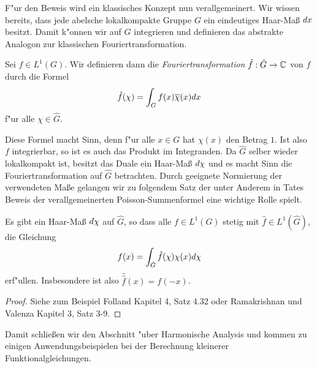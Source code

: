 	F"ur den Beweis wird ein klassisches Konzept nun verallgemeinert.
	Wir wissen bereits, dass jede abelsche lokalkompakte Gruppe $G$ ein eindeutiges Haar-Maß $\dx$ besitzt.
	Damit k"onnen wir auf $G$ integrieren und definieren das abstrakte Analogon zur klassischen Fouriertransformation.
	\begin{defi}[Fouriertransformation]
		Sei $f\in L^1(G)$. Wir definieren dann die \emph{Fouriertransformation} $\hat{f}: \hat{G} \to \C$ von $f$ durch die Formel
		\begin{align*}
			\hat{f}(\chi) = \int_G f(x)\conj{\chi}(x) dx
		\end{align*}
		f"ur alle $\chi \in \hat{G}$.
	\end{defi}
	Diese Formel macht Sinn, denn f"ur alle $x \in G$ hat $\chi(x)$ den Betrag $1$. 
	Ist also $f$ integrierbar, so ist es auch das Produkt im Integranden.
	Da $\hat{G}$ selber wieder lokalkompakt ist, besitzt das Duale ein Haar-Maß $\dx[\chi]$ und es macht Sinn die Fouriertransformation auf $\hat{G}$ betrachten.
	Durch geeignete Normierung der verwendeten Maße gelangen wir zu folgendem Satz der unter Anderem in Tates Beweis der verallgemeinerten Poisson-Summenformel eine wichtige Rolle spielt.
	\begin{satz}
		Es gibt ein Haar-Maß $\dx[\chi]$ auf $\hat{G}$, so dass alle $f \in L^1(G)$ stetig mit $\hat{f} \in L^1(\hat{G})$, die Gleichung
		\begin{align*}
			f(x) = \int_{\hat{G}} \hat{f}(\chi) \chi(x) \dx[\chi]
		\end{align*}
		erf"ullen. Insbesondere ist also $\hat{\hat{f}}(x) = f(-x)$.
	\end{satz}
	\begin{proof}
		Siehe zum Beispiel Folland \cite{folland} Kapitel 4, Satz 4.32 oder Ramakrishnan und Valenza \cite{rama} Kapitel 3, Satz 3-9.
	\end{proof}
	Damit schließen wir den Abschnitt "uber Harmonische Analysis und kommen zu einigen Anwendungsbeispielen bei der Berechnung kleinerer Funktionalgleichungen.

	
	
